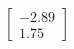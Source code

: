 \documentclass[preview]{standalone}
\begin{document}
\begin{align*}
\begin{bmatrix} -2.89 \\ 1.75 \end{bmatrix}
\end{align*}
\end{document}
